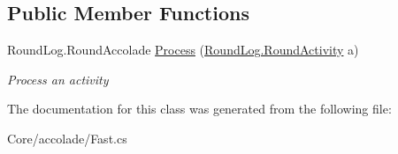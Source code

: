 \subsection*{Public Member Functions}
\begin{DoxyCompactItemize}
\item 
\hypertarget{class_m_b_c_1_1_core_1_1mbc_1_1accolade_1_1_fast_a889ec0b12577dc5ca345d281f00fbba2}{Round\-Log.\-Round\-Accolade \hyperlink{class_m_b_c_1_1_core_1_1mbc_1_1accolade_1_1_fast_a889ec0b12577dc5ca345d281f00fbba2}{Process} (\hyperlink{class_m_b_c_1_1_core_1_1_round_log_1_1_round_activity}{Round\-Log.\-Round\-Activity} a)}\label{class_m_b_c_1_1_core_1_1mbc_1_1accolade_1_1_fast_a889ec0b12577dc5ca345d281f00fbba2}

\begin{DoxyCompactList}\small\item\em Process an activity\end{DoxyCompactList}\end{DoxyCompactItemize}


The documentation for this class was generated from the following file\-:\begin{DoxyCompactItemize}
\item 
Core/accolade/Fast.\-cs\end{DoxyCompactItemize}
